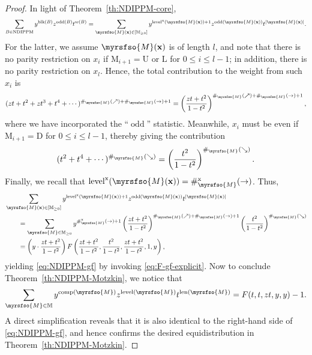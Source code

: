 \documentclass[12pt,reqno]{amsart}
\numberwithin{equation}{section}
\theoremstyle{theorem}
\theoremstyle{definition}
\theoremstyle{named}
\newcommand{\NDIPPM}{\operatorname{NDIPPM}}
\newcommand{\odd}{\operatorname{odd}}
\newcommand{\blk}{\operatorname{blk}}
\newcommand{\len}{\operatorname{len}}
\newcommand{\comp}{\operatorname{comp}}
\newcommand{\level}{\operatorname{level}}
\newcommand{\x}{\operatorname{x}}
\newcommand{\cM}{\myrsfso{M}}
\newcommand{\bbM}{\mathbb{M}}
\newcommand{\bfx}{\mathbf{x}}
\newcommand{\rmM}{\mathrm{M}}
\newcommand{\rU}{\mathrm{U}}
\newcommand{\rD}{\mathrm{D}}
\newcommand{\rL}{\mathrm{L}}
\begin{document}
\begin{proof}
	In light of Theorem~\ref{th:NDIPPM-core},
	\begin{align*}
		\sum_{B \in \NDIPPM} y^{\blk(B)} z^{\odd(B)} t^{w(B)} = \sum_{\cM(\bfx)\in [\bbM_{\ge 0}]} y^{\level^{\x}(\cM(\bfx)) + 1} z^{\odd(\cM(\bfx))} t^{|\cM(\bfx)|}.
	\end{align*}
	For the latter, we assume $\cM(\bfx)$ is of length $l$, and note that there is no parity restriction on $x_{i}$ if $\rmM_{i+1} = \rU$ or $\rL$ for $0\le i\le l-1$; in addition, there is no parity restriction on $x_{l}$. Hence, the total contribution to the weight from such $x_i$ is
	\begin{align*}
		(zt + t^2 + zt^3 + t^4 + \cdots)^{\#_{\cM}(\nearrow)+\#_{\cM}(\rightarrow)+1} = \left(\frac{zt+t^2}{1-t^2}\right)^{\#_{\cM}(\nearrow)+\#_{\cM}(\rightarrow)+1},
	\end{align*}
	where we have incorporated the ``$\odd$'' statistic. Meanwhile, $x_{i}$ must be even if $\rmM_{i+1} = \rD$ for $0\le i\le l-1$, thereby giving the contribution
	\begin{align*}
		(t^2 + t^4 + \cdots)^{\#_{\cM}(\searrow)} = \left(\frac{t^2}{1-t^2}\right)^{\#_{\cM}(\searrow)}.
	\end{align*}
	Finally, we recall that $\level^{\x}(\cM(\bfx)) = \#_{\cM}^{\x}(\rightarrow)$. Thus,
	\begin{align*}
		&\sum_{\cM(\bfx)\in [\bbM_{\ge 0}]} y^{\level^{\x}(\cM(\bfx)) + 1} z^{\odd(\cM(\bfx))} t^{|\cM(\bfx)|}\\
		&\qquad = \sum_{\cM\in \bbM_{\ge 0}}y^{\#_{\cM}^{\x}(\rightarrow)+1} \left(\frac{zt+t^2}{1-t^2}\right)^{\#_{\cM}(\nearrow)+\#_{\cM}(\rightarrow)+1} \left(\frac{t^2}{1-t^2}\right)^{\#_{\cM}(\searrow)}\\
		&\qquad = \left(y\cdot \frac{zt+t^2}{1-t^2}\right) F\left(\frac{zt+t^2}{1-t^2}, \frac{t^2}{1-t^2}, \frac{zt+t^2}{1-t^2}, 1, y\right),
	\end{align*}
	yielding \eqref{eq:NDIPPM-gf} by invoking \eqref{eq:F-gf-explicit}. Now to conclude Theorem~\ref{th:NDIPPM-Motzkin}, we notice that
	\begin{align*}
		\sum_{\cM\in \bbM} y^{\comp(\cM)} z^{\level(\cM)} t^{\len(\cM)} = F(t,t,zt,y,y) - 1.
	\end{align*}
	A direct simplification reveals that it is also identical to the right-hand side of \eqref{eq:NDIPPM-gf}, and hence confirms the desired equidistribution in Theorem~\ref{th:NDIPPM-Motzkin}.
\end{proof}
\end{document}
